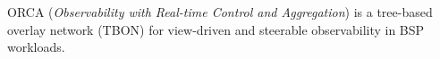 ORCA (\emph{Observability with Real-time Control and Aggregation}) is a tree-based overlay network
(TBON) for view-driven and steerable observability in BSP workloads.
